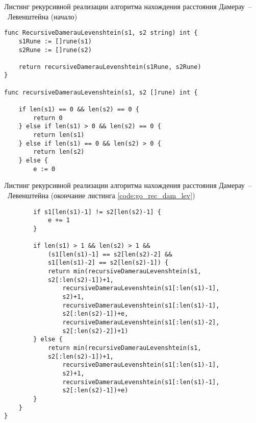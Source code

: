 \begin{code}
\caption{Листинг рекурсивной реализации алгоритма нахождения расстояния Дамерау~--~Левенштейна (начало)}
\label{code:go_rec_dam_lev}

\begin{verbatim}
func RecursiveDamerauLevenshtein(s1, s2 string) int {
	s1Rune := []rune(s1)
	s2Rune := []rune(s2)

	return recursiveDamerauLevenshtein(s1Rune, s2Rune)
}

func recursiveDamerauLevenshtein(s1, s2 []rune) int {

	if len(s1) == 0 && len(s2) == 0 {
		return 0
	} else if len(s1) > 0 && len(s2) == 0 {
		return len(s1)
	} else if len(s1) == 0 && len(s2) > 0 {
		return len(s2)
	} else {
		e := 0
\end{verbatim}
\end{code}

\begin{code}
\caption{Листинг рекурсивной реализации алгоритма нахождения расстояния Дамерау~--~Левенштейна (окончание листинга \ref{code:go_rec_dam_lev})}
\label{code:go_rec_dam_lev2}

\begin{verbatim}
		if s1[len(s1)-1] != s2[len(s2)-1] {
			e += 1
		}

		if len(s1) > 1 && len(s2) > 1 &&
			(s1[len(s1)-1] == s2[len(s2)-2] && 
			s1[len(s1)-2] == s2[len(s2)-1]) {
			return min(recursiveDamerauLevenshtein(s1, 
			s2[:len(s2)-1])+1,
				recursiveDamerauLevenshtein(s1[:len(s1)-1], 
				s2)+1,
				recursiveDamerauLevenshtein(s1[:len(s1)-1], 
				s2[:len(s2)-1])+e,
				recursiveDamerauLevenshtein(s1[:len(s1)-2], 
				s2[:len(s2)-2])+1)
		} else {
			return min(recursiveDamerauLevenshtein(s1, 
			s2[:len(s2)-1])+1,
				recursiveDamerauLevenshtein(s1[:len(s1)-1], 
				s2)+1,
				recursiveDamerauLevenshtein(s1[:len(s1)-1], 
				s2[:len(s2)-1])+e)
		}
	}
}
\end{verbatim}
\end{code}

\newpage


